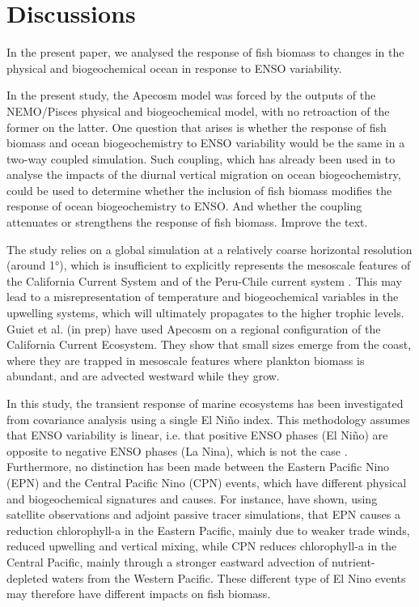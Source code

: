 \section{Discussions}

In the present paper, we analysed the response of fish biomass to changes in the physical and biogeochemical ocean in response to ENSO variability. 

In the present study, the Apecosm model was forced by the outputs of the NEMO/Pisces physical and biogeochemical model, with no retroaction of the former on the latter. One question that arises is whether the response of fish biomass and ocean biogeochemistry to ENSO variability would be the same in a two-way coupled simulation. 	Such coupling, which has already been used in \cite{aumontEvaluatingPotentialImpacts2018,} to analyse the impacts of the diurnal vertical migration on ocean biogeochemistry, could be used to determine whether the inclusion of fish biomass modifies the response of ocean biogeochemistry to ENSO. And whether the coupling attenuates or strengthens the response of fish biomass. Improve the text.
 
The study relies on a global simulation at a relatively coarse horizontal resolution (around 1°), which is insufficient to explicitly represents the mesoscale features of the California Current System \citep{capetMesoscaleSubmesoscaleTransition2008} and of the Peru-Chile current system \citep{colasHeatBalanceEddies2012}. This may lead to a misrepresentation of temperature and biogeochemical variables in the upwelling systems, which will ultimately propagates to the higher trophic levels. Guiet et al. (in prep) have used Apecosm on a regional configuration of the California Current Ecosystem. They show that small sizes emerge from the coast, where they are trapped in mesoscale features where plankton biomass is abundant, and are advected westward while they grow.

In this study, the transient response of marine ecosystems has been investigated from covariance analysis using a single El Niño index. This methodology assumes that ENSO variability is linear, i.e. that positive ENSO phases (El Niño) are opposite to negative ENSO phases (La Nina), which is not the case \citep{larkinENSOWarmNino2002}. Furthermore, no distinction has been made between the Eastern Pacific Nino (EPN) and the Central Pacific Nino (CPN) events, which have different physical and biogeochemical signatures and causes. For instance, \cite{gierachBiologicalResponse19972012} have shown, using satellite observations and adjoint passive tracer simulations, that EPN causes a reduction chlorophyll-a in the Eastern Pacific, mainly due to weaker trade winds, reduced upwelling and vertical mixing, while CPN reduces chlorophyll-a in the Central Pacific, mainly through a stronger eastward advection of nutrient-depleted waters from the Western Pacific. These different type of El Nino events may therefore have different impacts on fish biomass.


